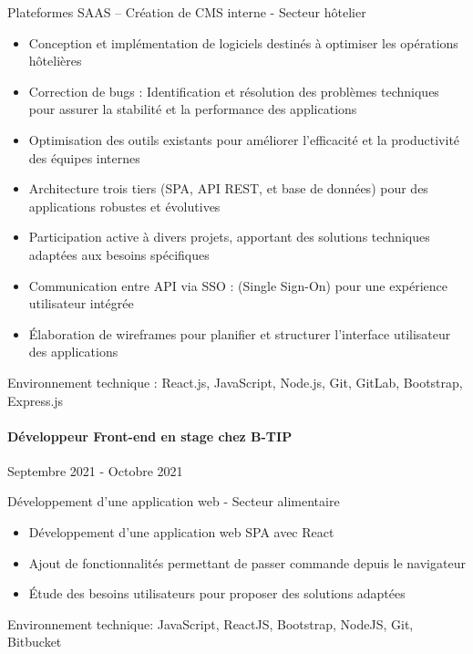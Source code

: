 \documentclass{article}
\begin{document}
\noindent
Plateformes SAAS – Création de CMS interne - Secteur hôtelier \\

\raggedright
\begin{itemize}
  \item{Conception et implémentation de logiciels destinés à optimiser les opérations hôtelières}
  \item{Correction de bugs : Identification et résolution des problèmes techniques pour assurer la stabilité
    et la performance des applications}
  \item{Optimisation des outils existants pour améliorer l'efficacité et la productivité des équipes internes}
  \item{Architecture trois tiers (SPA, API REST, et base de données) pour des applications robustes
    et évolutives}
  \item{Participation active à divers projets, apportant des solutions techniques adaptées aux besoins
spécifiques}
  \item{Communication entre API via SSO : (Single Sign-On) pour une expérience utilisateur intégrée}
  \item{Élaboration de wireframes pour planifier et structurer l'interface utilisateur des applications}
\end{itemize}
\noindent
Environnement technique : React.js, JavaScript, Node.js, Git, GitLab, Bootstrap, Express.js
\paragraph{Développeur Front-end en stage chez B-TIP}\hspace*{\fill}Septembre 2021 - Octobre 2021

\noindent
Développement d’une application web - Secteur alimentaire

\raggedright  
\begin{itemize}
  \item{Développement d'une application web SPA avec React}
  \item{Ajout de fonctionnalités permettant de passer commande depuis le navigateur}
  \item{Étude des besoins utilisateurs pour proposer des solutions adaptées}
\end{itemize}
\noindent
Environnement technique: JavaScript, ReactJS, Bootstrap, NodeJS, Git, Bitbucket
\end{document}
